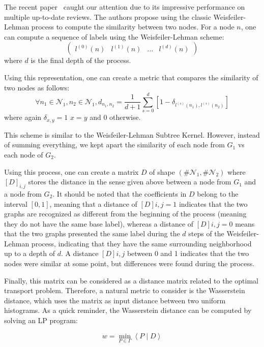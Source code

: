 \documentclass{IEEEtran}
\begin{document}
The recent paper~\cite{togninalli2019wasserstein}
caught our attention due to its impressive performance on multiple
up-to-date reviews.
The authors propose using
the classic Weisfeiler-Lehman process to compute the similarity between two nodes. For a node $n$, one can compute a sequence of labels using the Weisfeiler-Lehman scheme:
$$\begin{pmatrix} l^{(0)}(n) & l^{(1)}(n) & \dots & l^{(d)}(n)\end{pmatrix} $$
where $d$ is the final depth of the process.

Using this representation, one can create a metric that compares the similarity of two nodes as follows:
\begin{equation*}
    \forall n_1 \in \mathcal{N}_1, n_2 \in \mathcal{N}_1,
    d_{n_1, n_2} = \frac{1}{d+1} \sum_{s = 0}^d [1 - \delta_{l^{(s)}(n_1), l^{(s)}(n_2)}]
\end{equation*}
where again $\delta_{x, y} = 1$  $x=y$ and $0$ otherwise.

This scheme is similar to the Weisfeiler-Lehman Subtree Kernel.
However, instead of summing everything,
we kept apart the similarity of each node from $G_1$ vs each node of $G_2$.

Using this process, one can create a matrix $D$ of shape
$(\# \mathcal{N}_1, \# \mathcal{N}_2)$
where $[D]_{i,j}$ stores the distance in the sense given above between a node from
$G_1$ and a node from $G_2$.
It should be noted that the coefficients in $D$ belong to the interval $[0,1]$, meaning that a distance of $[D]{i,j} = 1$ indicates that the two graphs are recognized as different from the beginning of the process (meaning they do not have the same base label), whereas a distance of $[D]{i,j} = 0$ means that the two graphs presented the same label during the $d$ steps of the Weisfeiler-Lehman process, indicating that they have the same surrounding neighborhood up to a depth of $d$. A distance $[D]{i,j}$ between 0 and 1 indicates that the two nodes were similar at some point,
but differences were found during the process.

Finally, this matrix can be considered as a distance matrix related to the optimal transport problem. Therefore, a natural metric to consider is the Wasserstein distance, which uses the matrix as input distance between two uniform histograms.
As a quick reminder, the Wasserstein distance can be computed by solving an LP program: ~\cite{togninalli2019wasserstein}

\begin{equation*}
    w = \underset{P \in \Gamma}{\operatorname*{min}} \left< P \; | \; D \right>
\end{equation*}
\end{document}
